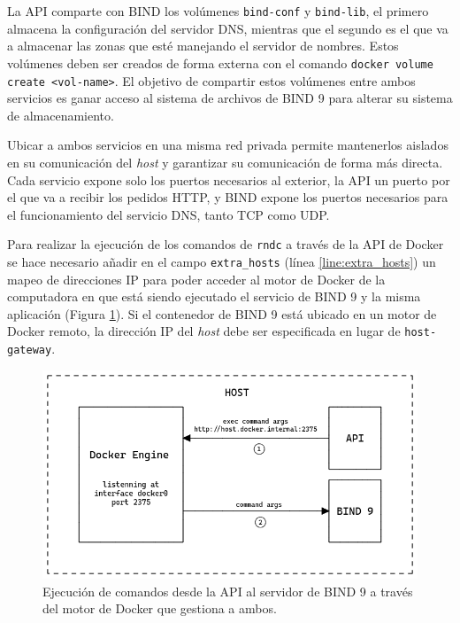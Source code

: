 La API comparte con BIND los volúmenes \verb|bind-conf| y \verb|bind-lib|, el primero almacena la configuración del servidor DNS, mientras que el segundo es el que va a almacenar las zonas que esté manejando el servidor de nombres. Estos volúmenes deben ser creados de forma externa con el comando \verb|docker volume create <vol-name>|. El objetivo de compartir estos volúmenes entre ambos servicios es ganar acceso al sistema de archivos de BIND 9 para alterar su sistema de almacenamiento.

Ubicar a ambos servicios en una misma red privada permite mantenerlos aislados en su comunicación del \textit{host} y garantizar su comunicación de forma más directa. Cada servicio expone solo los puertos necesarios al exterior, la API un puerto por el que va a recibir los pedidos HTTP, y BIND expone los puertos necesarios para el funcionamiento del servicio DNS, tanto TCP como UDP.

Para realizar la ejecución de los comandos de \verb|rndc| a través de la API de Docker se hace necesario añadir en el campo \verb|extra_hosts| (línea \ref{line:extra_hosts}) un mapeo de direcciones IP para poder acceder al motor de Docker de la computadora en que está siendo ejecutado el servicio de BIND 9 y la misma aplicación (Figura \ref{fig:extra_hosts}). Si el contenedor de BIND 9 está ubicado en  un motor de Docker remoto, la dirección IP del \textit{host} debe ser especificada en lugar de \verb|host-gateway|.

\begin{figure}[!ht]
    \centering
    \includegraphics[width=\linewidth]{draws/extra_hosts.png}
    \caption{Ejecución de comandos desde la API al servidor de BIND 9 a través del motor de Docker que gestiona a ambos.}
    \label{fig:extra_hosts}
\end{figure}

